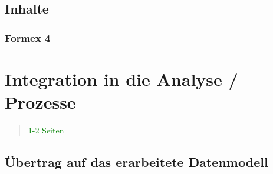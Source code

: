     \pagebreak
    \subsection{Inhalte}

    \subsubsection{Formex 4}




        \pagebreak
    
    \section{Integration in die Analyse / Prozesse}
    
\begin{quote}
\textcolor{green}{1-2 Seiten}
\end{quote}

\subsection{Übertrag auf das erarbeitete Datenmodell}
\pagebreak